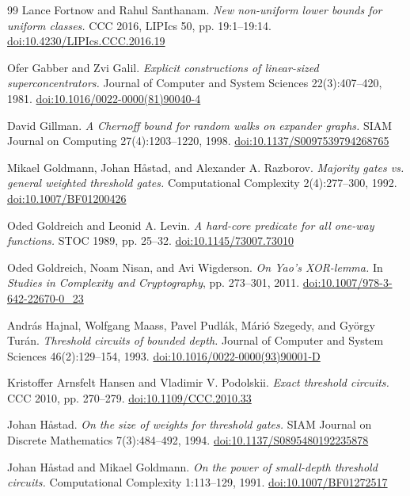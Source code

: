 \documentclass[11pt,letterpaper]{article}
\theoremstyle{definition}
\theoremstyle{remark}
\begin{document}
\begin{thebibliography}{99}
 Lance Fortnow and Rahul Santhanam. \emph{New non-uniform
lower bounds for uniform classes.} CCC 2016, LIPIcs 50, pp. 19:1--19:14.
\href{https://doi.org/10.4230/LIPIcs.CCC.2016.19}{doi:10.4230/LIPIcs.CCC.2016.19}

 Ofer Gabber and Zvi Galil. \emph{Explicit constructions of
linear-sized superconcentrators.} Journal of Computer and System
Sciences 22(3):407--420, 1981.
\href{https://doi.org/10.1016/0022-0000(81)90040-4}{doi:10.1016/0022-0000(81)90040-4}

 David Gillman. \emph{A Chernoff bound for random walks on
expander graphs.} SIAM Journal on Computing 27(4):1203--1220, 1998.
\href{https://doi.org/10.1137/S0097539794268765}{doi:10.1137/S0097539794268765}

 Mikael Goldmann, Johan Håstad, and Alexander A. Razborov.
\emph{Majority gates vs. general weighted threshold gates.}
Computational Complexity 2(4):277--300, 1992.
\href{https://doi.org/10.1007/BF01200426}{doi:10.1007/BF01200426}

 Oded Goldreich and Leonid A. Levin. \emph{A hard-core
predicate for all one-way functions.} STOC 1989, pp. 25--32.
\href{https://doi.org/10.1145/73007.73010}{doi:10.1145/73007.73010}

 Oded Goldreich, Noam Nisan, and Avi Wigderson. \emph{On
Yao's XOR-lemma.} In \emph{Studies in Complexity and
Cryptography}, pp. 273--301, 2011.
\href{https://doi.org/10.1007/978-3-642-22670-0_23}{doi:10.1007/978-3-642-22670-0\_23}

 András Hajnal, Wolfgang Maass, Pavel Pudlák, Márió
Szegedy, and György Turán. \emph{Threshold circuits of bounded depth.}
Journal of Computer and System Sciences 46(2):129--154, 1993.
\href{https://doi.org/10.1016/0022-0000(93)90001-D}{doi:10.1016/0022-0000(93)90001-D}

 Kristoffer Arnsfelt Hansen and Vladimir V. Podolskii.
\emph{Exact threshold circuits.} CCC 2010, pp. 270--279.
\href{https://doi.org/10.1109/CCC.2010.33}{doi:10.1109/CCC.2010.33}

 Johan Håstad. \emph{On the size of weights for threshold
gates.} SIAM Journal on Discrete Mathematics 7(3):484--492, 1994.
\href{https://doi.org/10.1137/S0895480192235878}{doi:10.1137/S0895480192235878}

 Johan Håstad and Mikael Goldmann. \emph{On the power of
small-depth threshold circuits.} Computational Complexity 1:113--129,
1991. \href{https://doi.org/10.1007/BF01272517}{doi:10.1007/BF01272517}


\end{thebibliography}
\end{document}
